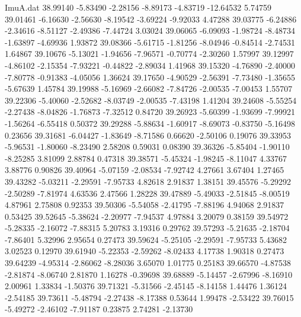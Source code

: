 \begin{filecontents}{ImuA.dat}
  38.99140   -5.83490   -2.28156   -8.89173   -4.83719  -12.64532    5.74759
  39.01461   -6.16630   -2.56630   -8.19542   -3.69224   -9.92033    4.47288
  39.03775   -6.24886   -2.34616   -8.51127   -2.49386   -7.44724    3.03024
  39.06065   -6.09093   -1.98724   -8.48734   -1.63897   -4.69936    1.93872
  39.08366   -5.61715   -1.81256   -8.04946   -0.84514   -2.74531    1.64867
  39.10676   -5.13021   -1.94656   -7.96571   -0.70774   -2.30260    1.57997
  39.12997   -4.86102   -2.15354   -7.93221   -0.44822   -2.89034    1.41968
  39.15320   -4.76890   -2.40000   -7.80778   -0.91383   -4.05056    1.36624
  39.17650   -4.90529   -2.56391   -7.73480   -1.35655   -5.67639    1.45784
  39.19988   -5.16969   -2.66082   -7.84726   -2.00535   -7.00453    1.55707
  39.22306   -5.40060   -2.52682   -8.03749   -2.00535   -7.43198    1.41204
  39.24608   -5.55254   -2.27438   -8.04826   -1.76873   -7.32512    0.84720
  39.26923   -5.60399   -1.93699   -7.99921   -1.56264   -6.55418    0.50372
  39.29288   -5.88634   -1.60917   -8.69073   -0.83750   -5.16498    0.23656
  39.31681   -6.04427   -1.83649   -8.71586    0.66620   -2.50106    0.19076
  39.33953   -5.96531   -1.80060   -8.23490    2.58208    0.59031    0.08390
  39.36326   -5.85404   -1.90110   -8.25285    3.81099    2.88784    0.47318
  39.38571   -5.45324   -1.98245   -8.11047    4.33767    3.88776    0.90826
  39.40964   -5.07159   -2.08534   -7.92742    4.27661    3.67404    1.27465
  39.43282   -5.03211   -2.29591   -7.95733    4.82618    2.91837    1.38151
  39.45576   -5.29292   -2.50289   -7.81974    4.63536    2.47566    1.28228
  39.47889   -5.49033   -2.51845   -8.00519    4.87961    2.75808    0.92353
  39.50306   -5.54058   -2.41795   -7.88196    4.94068    2.91837    0.53425
  39.52645   -5.38624   -2.20977   -7.94537    4.97884    3.20079    0.38159
  39.54972   -5.28335   -2.16072   -7.88315    5.20783    3.19316    0.29762
  39.57293   -5.21635   -2.18704   -7.86401    5.32996    2.95654    0.27473
  39.59624   -5.25105   -2.29591   -7.95733    5.43682    3.02523    0.12970
  39.61940   -5.22353   -2.59262   -8.02433    4.17738    1.90318    0.27473
  39.64239   -4.95314   -2.86062   -8.28036    3.65070    1.01775    0.25183
  39.66570   -4.87538   -2.81874   -8.06740    2.81870    1.16278   -0.39698
  39.68889   -5.14457   -2.67996   -8.16910    2.00961    1.33834   -1.50376
  39.71321   -5.31566   -2.45145   -8.14158    1.44476    1.36124   -2.54185
  39.73611   -5.48794   -2.27438   -8.17388    0.53644    1.99478   -2.53422
  39.76015   -5.49272   -2.46102   -7.91187    0.23875    2.74281   -2.13730

\end{filecontents}
